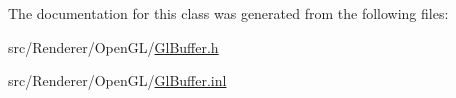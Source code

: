 The documentation for this class was generated from the following files\+:\begin{DoxyCompactItemize}
\item 
src/\+Renderer/\+Open\+G\+L/\hyperlink{_gl_buffer_8h}{Gl\+Buffer.\+h}\item 
src/\+Renderer/\+Open\+G\+L/\hyperlink{_gl_buffer_8inl}{Gl\+Buffer.\+inl}\end{DoxyCompactItemize}
